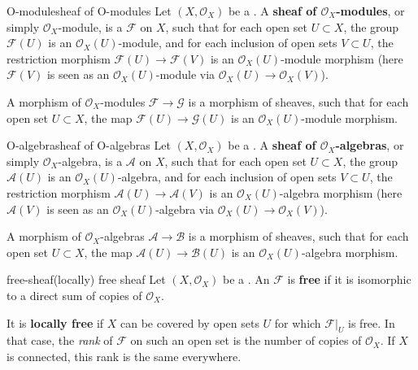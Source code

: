 \begin{topic}{O-module}{sheaf of O-modules}
    Let $(X, \mathcal{O}_X)$ be a . A \textbf{sheaf of $\mathcal{O}_X$-modules}, or simply $\mathcal{O}_X$-module, is a  $\mathcal{F}$ on $X$, such that for each open set $U \subset X$, the group $\mathcal{F}(U)$ is an $\mathcal{O}_X(U)$-module, and for each inclusion of open sets $V \subset U$, the restriction morphism $\mathcal{F}(U) \to \mathcal{F}(V)$ is an $\mathcal{O}_X(U)$-module morphism (here $\mathcal{F}(V)$ is seen as an $\mathcal{O}_X(U)$-module via $\mathcal{O}_X(U) \to \mathcal{O}_X(V)$).
    
    A morphism of $\mathcal{O}_X$-modules $\mathcal{F} \to \mathcal{G}$ is a morphism of sheaves, such that for each open set $U \subset X$, the map $\mathcal{F}(U) \to \mathcal{G}(U)$ is an $\mathcal{O}_X(U)$-module morphism.
\end{topic}

\begin{topic}{O-algebra}{sheaf of O-algebras}
    Let $(X, \mathcal{O}_X)$ be a . A \textbf{sheaf of $\mathcal{O}_X$-algebras}, or simply $\mathcal{O}_X$-algebra, is a  $\mathcal{A}$ on $X$, such that for each open set $U \subset X$, the group $\mathcal{A}(U)$ is an $\mathcal{O}_X(U)$-algebra, and for each inclusion of open sets $V \subset U$, the restriction morphism $\mathcal{A}(U) \to \mathcal{A}(V)$ is an $\mathcal{O}_X(U)$-algebra morphism (here $\mathcal{A}(V)$ is seen as an $\mathcal{O}_X(U)$-algebra via $\mathcal{O}_X(U) \to \mathcal{O}_X(V)$).
    
    A morphism of $\mathcal{O}_X$-algebras $\mathcal{A} \to \mathcal{B}$ is a morphism of sheaves, such that for each open set $U \subset X$, the map $\mathcal{A}(U) \to \mathcal{B}(U)$ is an $\mathcal{O}_X(U)$-algebra morphism.
\end{topic}

\begin{topic}{free-sheaf}{(locally) free sheaf}
    Let $(X, \mathcal{O}_X)$ be a . An  $\mathcal{F}$ is \textbf{free} if it is isomorphic to a direct sum of copies of $\mathcal{O}_X$.
    
    It is \textbf{locally free} if $X$ can be covered by open sets $U$ for which $\mathcal{F}|_U$ is free. In that case, the \textit{rank} of $\mathcal{F}$ on such an open set is the number of copies of $\mathcal{O}_X$. If $X$ is connected, this rank is the same everywhere.
\end{topic}

